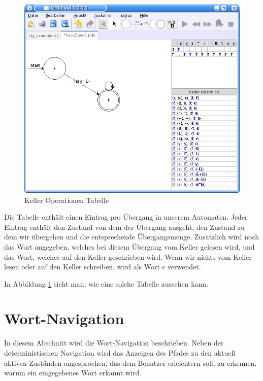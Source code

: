 \begin{figure}[h!]
\begin{center}
\includegraphics[width=12cm]{../images/stack_operation_table.png}
\caption{Keller Operationen Tabelle}
\label{FigureStackOperationTable}
\end{center}
\end{figure}
\vspace{10pt}

Die Tabelle enthält einen Eintrag pro Übergang in unserem Automaten. Jeder
Eintrag enthält den Zustand von dem der Übergang ausgeht, den Zustand zu dem
wir übergehen und die entsprechende Übergangsmenge. Zusätzlich wird noch
das Wort angegeben, welches bei diesem Übergang vom Keller gelesen wird, und
das Wort, welches auf den Keller geschrieben wird. Wenn wir nichts vom
Keller lesen oder auf den Keller schreiben, wird als Wort $\epsilon$
verwendet.\vspace{10pt} 

In Abbildung \ref{FigureStackOperationTable} sieht man, wie eine
solche Tabelle aussehen kann.\vspace{10pt}


\section{Wort-Navigation}\label{WordNavigation}

In diesem Abschnitt wird die Wort-Navigation beschrieben. Neben der
deterministischen Navigation wird das Anzeigen des Pfades zu den aktuell
aktiven Zuständen angesprochen, das dem Benutzer erleichtern soll, zu
erkennen, warum ein eingegebenes Wort erkannt wird.


